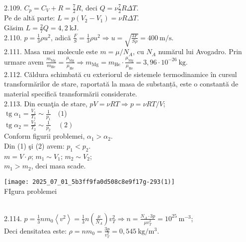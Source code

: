2.109. $C_{p}=C_{V}+R=\frac{7}{2} R$, deci $Q=\nu \frac{7}{2} R \Delta T$.\\ Pe de altă parte: $L=p\left(V_{2}-V_{1}\right)=\nu R \Delta T$.\\ Găsim $L=\frac{2}{7} Q=4,2 \mathrm{~kJ}$.\\

2.110. $p=\frac{1}{3} \rho u^{2}$, adică $\frac{F}{S}=\frac{1}{3} \rho u^{2} \Rightarrow u=\sqrt{\frac{3 F}{S \rho}}=400 \mathrm{~m} / \mathrm{s}$.\\

2.111. Masa unei molecule este $m=\mu / N_{A}$, cu $N_{A}$ numărul lui Avogadro. Prin urmare avem $\frac{m_{\mathrm{Mg}}}{m_{\mathrm{He}}}=\frac{\mu_{\mathrm{Mg}}}{\mu_{\mathrm{He}}} \Rightarrow m_{\mathrm{Mg}}=m_{\mathrm{He}} \cdot \frac{\mu_{\mathrm{Mg}}}{\mu_{\mathrm{He}}}=3,96 \cdot 10^{-26} \mathrm{~kg}$.\\

2.112. Căldura schimbată cu exteriorul de sistemele termodinamice în cursul transformărilor de stare, raportată la masa de substanță, este o constantă de material specifică transformării considerate.\\

2.113. Din ecuaţia de stare, $p V=\nu R T \Rightarrow p=\nu R T / V$;\\ $\operatorname{tg} \alpha_{1}=\frac{V_{1}}{T_{1}} \sim \frac{1}{p_{1}} \quad (1$)\\ $\operatorname{tg} \alpha_{2}=\frac{V_{2}}{T_{2}} \sim \frac{1}{p_{2}} \quad (2)$\\ Conform figurii problemei, $\alpha_{1}>\alpha_{2}$.\\ Din (1) şi (2) avem: $p_{1}<p_{2}$.\\ $m=V \cdot \rho$; \quad $m_{1} \sim V_{1}$; \quad $m_{2} \sim V_{2}$;\\ $m_{1}>m_{2}$, deci masa scade.\\ \begin{center} \texttt{[image: 2025\_07\_01\_5b3ff9fa0d508c8e9f17g-293(1)]}\\ FIgura problemei \end{center}\\

2.114. $p=\frac{1}{3} n m_{0}\left\langle v^{2}\right\rangle=\frac{1}{3} n\left(\frac{\mu}{N_{A}}\right) v_{T}^{2} \Rightarrow n=\frac{N_{A} \cdot 3 p}{\mu v_{T}^{2}}=10^{25} \mathrm{~m}^{-3}$;\\ Deci densitatea este: $\rho=n m_{0}=\frac{3 p}{v_{T}^{2}}=0,545 \mathrm{~kg} / \mathrm{m}^{3}$.\\

